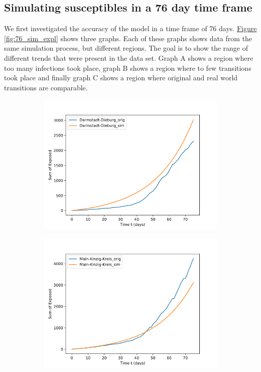 \subsection{Simulating susceptibles in a 76 day time frame}
We first investigated the accuracy of the model in a time frame of 76 days.
\hyperref[fig:76_sim_expl]{Figure \ref*{fig:76_sim_expl}} shows three graphs. Each of these graphs shows data from the same simulation
process, but different regions. The goal is to show the range of different trends that were present in the data set. Graph A shows
a region where too many infections took place, graph B shows a region where to few transitions took place and finally graph C shows
a region where original and real world transitions are comparable.\newline

\begin{figure}[h]
	\centering
	\begin{subfigure}[b]{0.3\textwidth}
		\centering
		\includegraphics[width=\textwidth]{./figures/76d/24_Darmstadt-Dieburg.png}	
		\caption{}
	\end{subfigure}
	\hfill
	\begin{subfigure}[b]{0.3\textwidth}
		\centering
		\includegraphics[width=\textwidth]{./figures/76d/13_Main-Kinzig-Kreis.png}	

\end{subfigure}
\end{figure}
